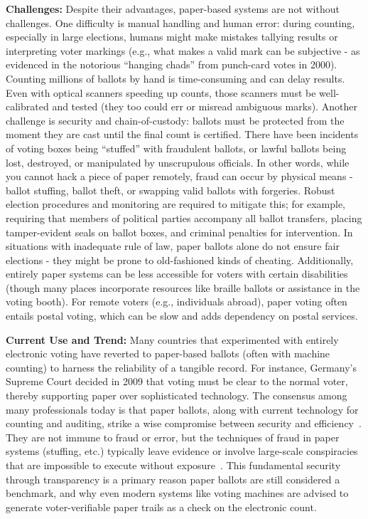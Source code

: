 \documentclass[a4paper,10pt]{report}
\begin{document}
  \textbf  {Challenges:}   Despite their advantages, paper-based systems are not without challenges.   One difficulty is manual handling and human error: during counting, especially in large elections, humans might make mistakes tallying results or interpreting voter markings (e.g., what makes a valid mark can be subjective - as evidenced in the notorious ``hanging chads'' from punch-card votes in 2000).   Counting millions of ballots by hand is time-consuming and can delay results.   Even with optical scanners speeding up counts, those scanners must be well-calibrated and tested (they too could err or misread ambiguous marks).   Another challenge is security and chain-of-custody: ballots must be protected from the moment they are cast until the final count is certified.   There have been incidents of voting boxes being ``stuffed'' with fraudulent ballots, or lawful ballots being lost, destroyed, or manipulated by unscrupulous officials.   In other words, while you cannot hack a piece of paper remotely, fraud can occur by physical means - ballot stuffing, ballot theft, or swapping valid ballots with forgeries.   Robust election procedures and monitoring are required to mitigate this; for example, requiring that members of political parties accompany all ballot transfers, placing tamper-evident seals on ballot boxes, and criminal penalties for intervention.   In situations with inadequate rule of law, paper ballots alone do not ensure fair elections - they might be prone to old-fashioned kinds of cheating.   Additionally, entirely paper systems can be less accessible for voters with certain disabilities (though many places incorporate resources like braille ballots or assistance in the voting booth).   For remote voters (e.g., individuals abroad), paper voting often entails postal voting, which can be slow and adds dependency on postal services.

  \textbf  {Current Use and Trend:}   Many countries that experimented with entirely electronic voting have reverted to paper-based ballots (often with machine counting) to harness the reliability of a tangible record.   For instance, Germany’s Supreme Court decided in 2009 that voting must be clear to the normal voter, thereby supporting paper over sophisticated technology.   The consensus among many professionals today is that paper ballots, along with current technology for counting and auditing, strike a wise compromise between security and efficiency~\cite{brookings2018paper}.   They are not immune to fraud or error, but the techniques of fraud in paper systems (stuffing, etc.) typically leave evidence or involve large-scale conspiracies that are impossible to execute without exposure~\cite{sri2010paper}.   This fundamental security through transparency is a primary reason paper ballots are still considered a benchmark, and why even modern systems like voting machines are advised to generate voter-verifiable paper trails as a check on the electronic count.
\end{document}
